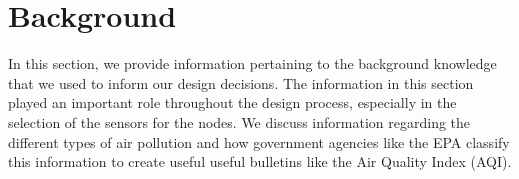 \section{Background}
In this section, we provide information pertaining to the background knowledge that we used to inform our design decisions. The information in this section played an important role throughout the design process, especially in the selection of the sensors for the nodes. We discuss information regarding the different types of air pollution and how government agencies like the EPA classify this information to create useful useful bulletins like the Air Quality Index (AQI). 


